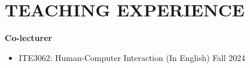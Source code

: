 \documentclass[a4paper,11pt]{article}
\makeatletter
\newcommand{\resumePOR}[3]{
\vspace{0.5mm}\item
    \begin{tabular*}{0.97\textwidth}[t]{l@{\extracolsep{\fill}}r}
        \textbf{#1}\hspace{0.3mm}#2 & \textit{\small{#3}} 
    \end{tabular*}
    \vspace{-2mm}
}
\newcommand{\resumeProject}[4]{
\vspace{0.5mm}\item
    \begin{tabular*}{0.98\textwidth}[t]{@{}p{0.8\textwidth}@{\extracolsep{\fill}}r}
        \textbf{#1} & \textit{\footnotesize{#3}} \\
        \footnotesize{\textit{#2}} & \footnotesize{#4}
    \end{tabular*}
    \vspace{-2.4mm}
}
\newcommand{\resumeSubHeadingListStart}{\begin{itemize}[leftmargin=*,labelsep=1mm]}
\newcommand{\resumeItemListStart}{\begin{itemize}[leftmargin=*,labelsep=1mm,itemsep=0.5mm]}
\newcommand{\resumeSubHeadingListEnd}{\end{itemize}\vspace{2mm}}
\newcommand{\resumeItemListEnd}{\end{itemize}\vspace{-2mm}}
\makeatother
\begin{document}





\section{\textbf{TEACHING EXPERIENCE}}
\textbf{Co-lecturer}
\vspace{-0.7mm}
\resumeItemListStart
  \item ITE3062: Human-Computer Interaction (In English) \hfill Fall 2024 \\
\resumeItemListEnd
\vspace{1.0mm}
\end{document}

